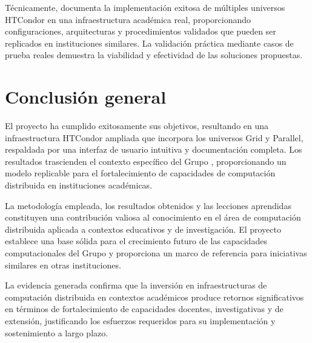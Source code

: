 Técnicamente, documenta la implementación exitosa de múltiples universos HTCondor en una infraestructura académica real, proporcionando configuraciones, arquitecturas y procedimientos validados que pueden ser replicados en instituciones similares. La validación práctica mediante casos de prueba reales demuestra la viabilidad y efectividad de las soluciones propuestas.

\section{Conclusión general}
\noindent

El proyecto ha cumplido exitosamente sus objetivos, resultando en una infraestructura HTCondor ampliada que incorpora los universos Grid y Parallel, respaldada por una interfaz de usuario intuitiva y documentación completa. Los resultados trascienden el contexto específico del Grupo \GRID, proporcionando un modelo replicable para el fortalecimiento de capacidades de computación distribuida en instituciones académicas.

La metodología empleada, los resultados obtenidos y las lecciones aprendidas constituyen una contribución valiosa al conocimiento en el área de computación distribuida aplicada a contextos educativos y de investigación. El proyecto establece una base sólida para el crecimiento futuro de las capacidades computacionales del Grupo \GRID y proporciona un marco de referencia para iniciativas similares en otras instituciones.

La evidencia generada confirma que la inversión en infraestructuras de computación distribuida en contextos académicos produce retornos significativos en términos de fortalecimiento de capacidades docentes, investigativas y de extensión, justificando los esfuerzos requeridos para su implementación y sostenimiento a largo plazo.
